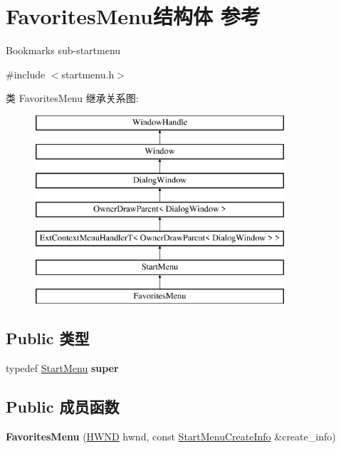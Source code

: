 \hypertarget{struct_favorites_menu}{}\section{Favorites\+Menu结构体 参考}
\label{struct_favorites_menu}


Bookmarks sub-\/startmenu  




{\ttfamily \#include $<$startmenu.\+h$>$}

类 Favorites\+Menu 继承关系图\+:\begin{figure}[H]
\begin{center}
\leavevmode
\includegraphics[height=7.000000cm]{struct_favorites_menu}
\end{center}
\end{figure}
\subsection*{Public 类型}
\begin{DoxyCompactItemize}
\item 
\mbox{\label{struct_favorites_menu_a985fb646862162f622b7cf4ca8d3de4b}} 
typedef \hyperlink{struct_start_menu}{Start\+Menu} {\bfseries super}
\end{DoxyCompactItemize}
\subsection*{Public 成员函数}
\begin{DoxyCompactItemize}
\item 
\mbox{\label{struct_favorites_menu_afbf21475fa2617efaf970fcaff47b68e}} 
{\bfseries Favorites\+Menu} (\hyperlink{interfacevoid}{H\+W\+ND} hwnd, const \hyperlink{struct_start_menu_create_info}{Start\+Menu\+Create\+Info} \&create\+\_\+info)
\end{DoxyCompactItemize}
